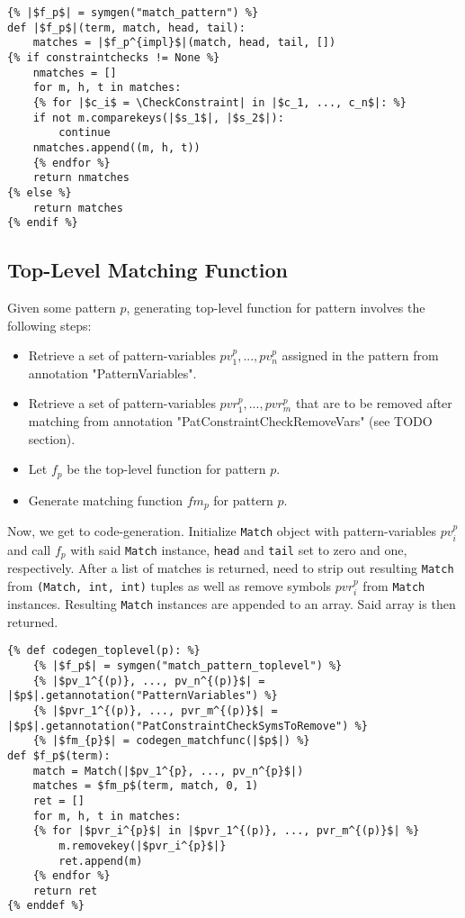 \begin{verbatim}
{% |$f_p$| = symgen("match_pattern") %}
def |$f_p$|(term, match, head, tail):
	matches = |$f_p^{impl}$|(match, head, tail, [])
{% if constraintchecks != None %}
	nmatches = []
	for m, h, t in matches:
	{% for |$c_i$ = \CheckConstraint| in |$c_1, ..., c_n$|: %}
	if not m.comparekeys(|$s_1$|, |$s_2$|):
		continue
	nmatches.append((m, h, t))
	{% endfor %}
	return nmatches
{% else %}
	return matches
{% endif %}
\end{verbatim} 

\subsection{Top-Level Matching Function}
Given some pattern $p$, generating top-level function for pattern involves the following steps: 

\begin{itemize}
\item Retrieve a set of pattern-variables $pv_1^{p}, ..., pv_n^{p}$ assigned in the pattern from annotation "PatternVariables".
\item Retrieve a set of pattern-variables $pvr_1^{p}, ..., pvr_m^{p}$ that are to be removed after matching from annotation "PatConstraintCheckRemoveVars" (see TODO section).
\item Let $f_p$ be the top-level function for pattern $p$.
\item Generate matching function $fm_p$ for pattern $p$.
\end{itemize}

Now, we get to code-generation. Initialize \texttt{Match} object with pattern-variables $pv_i^{p}$ and call $f_p$ with said \texttt{Match} instance, \texttt{head} and \texttt{tail} set to zero and one, respectively. After a list of matches is returned, need to strip out resulting \texttt{Match} from \texttt{(Match, int, int)}  tuples as well as remove symbols $pvr_i^{p}$ from \texttt{Match} instances. Resulting \texttt{Match} instances are appended to an array. Said array is then returned.


\begin{verbatim}
{% def codegen_toplevel(p): %}
	{% |$f_p$| = symgen("match_pattern_toplevel") %}
	{% |$pv_1^{(p)}, ..., pv_n^{(p)}$| = |$p$|.getannotation("PatternVariables") %}
	{% |$pvr_1^{(p)}, ..., pvr_m^{(p)}$| = |$p$|.getannotation("PatConstraintCheckSymsToRemove") %}
	{% |$fm_{p}$| = codegen_matchfunc(|$p$|) %}
def $f_p$(term):
	match = Match(|$pv_1^{p}, ..., pv_n^{p}$|)
	matches = $fm_p$(term, match, 0, 1)
	ret = []	
	for m, h, t in matches:
	{% for |$pvr_i^{p}$| in |$pvr_1^{(p)}, ..., pvr_m^{(p)}$| %}
		m.removekey(|$pvr_i^{p}$|}
		ret.append(m)
	{% endfor %}
	return ret
{% enddef %}
\end{verbatim} 
